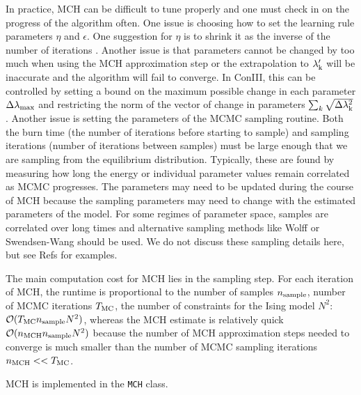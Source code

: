 \documentclass[aps,prl,twocolumn,nofootinbib]{revtex4-1}
\begin{document}
In practice, MCH can be difficult to tune properly and one must check in on the progress of the algorithm often. One issue is choosing how to set the learning rule parameters $\eta$ and $\epsilon$. One suggestion for $\eta$ is to shrink it as the inverse of the number of iterations \cite{Tkacik:2006vq}. Another issue is that parameters cannot be changed by too much when using the MCH approximation step or the extrapolation to $\lambda_{\rm k}'$ will be inaccurate and the algorithm will fail to converge. In ConIII, this can be controlled by setting a bound on the maximum possible change in each parameter  $\Delta\lambda_{\rm max}$ and restricting the norm of the vector of change in parameters $\sum_k \sqrt{\Delta\lambda_{\rm k}^2}$. Another issue is setting the parameters of the MCMC sampling routine. Both the burn time (the number of iterations before starting to sample) and sampling iterations (number of iterations between samples) must be large enough that we are sampling from the equilibrium distribution.  Typically, these are found by measuring how long the energy or individual parameter values remain correlated as MCMC progresses. The parameters may need to be updated during the course of MCH because the sampling parameters may need to change with the estimated parameters of the model. For some regimes of parameter space, samples are correlated over long times and alternative sampling methods like Wolff or Swendsen-Wang should be used.
We do not discuss these sampling details here, but see Refs \cite{MacKay:2005wc,Newman:1999wu} for examples.

The main computation cost for MCH lies in the sampling step. For each iteration of MCH, the runtime is proportional to the number of samples $n_{\rm sample}$, number of MCMC iterations $T_{\rm MC}$, the number of constraints for the Ising model $N^2$:
$\mathcal{O}(T_{\rm MC} n_{\rm sample} N^2)$, whereas the MCH estimate is relatively quick $\mathcal{O}(n_{\rm MCH} n_{\rm sample} N^2)$ because the number of MCH approximation steps needed to converge is much smaller than the number of MCMC sampling iterations $n_{\rm MCH}<<T_{\rm MC}$.

MCH is implemented in the {\tt MCH} class.
\end{document}
